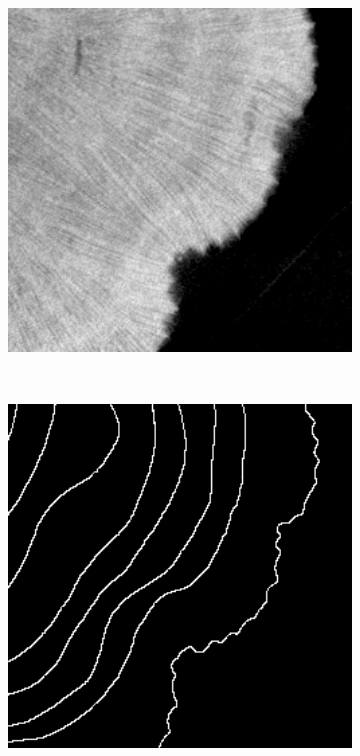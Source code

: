 \begin{figure}[t]
    \centering
    \centering
    \begin{subfigure}[t]{0.32\textwidth}
        \centering
        \includegraphics[width=1\textwidth, valign=c]{images/label-example-1.png}
    \end{subfigure}
    ~
    \begin{subfigure}[t]{0.32\textwidth}
        \centering
        \includegraphics[width=1\textwidth, valign=c]{images/label-example-2.png}

\end{subfigure}
\end{figure}
